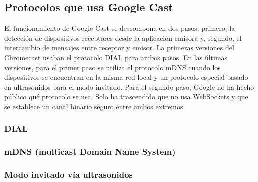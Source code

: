 \subsection{Protocolos que usa Google Cast}

El funcionamiento de Google Cast se descompone en dos pasos: primero, la detección de dispositivos receptores desde la aplicación emisora y, segundo, el intercambio de mensajes entre receptor y emisor.
La primeras versiones del Chromecast usaban el protocolo DIAL para ambos pasos.
En las últimas versiones, para el primer paso se utiliza el protocolo mDNS cuando los dispositivos se encuentran en la misma red local y un protocolo especial basado en ultrasonidos para el modo invitado. Para el segundo paso, Google no ha hecho público qué protocolo se usa. Solo ha trascendido \href{https://plus.google.com/116723992087294619013/posts/d6TLN4S8mrH}{que no usa WebSockets y que se establece un canal binario seguro entre ambos extremos}.

\subsubsection{DIAL}


\subsubsection{mDNS (multicast Domain Name System)}


\subsubsection{Modo invitado vía ultrasonidos}

